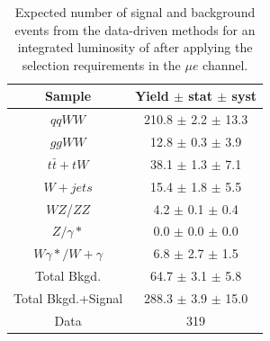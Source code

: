 \begin{table}[ht!]
  \begin{center}
  \begin{tabular} {|c|c|}
\hline
Sample                & Yield $\pm$ stat $\pm$ syst \\ \hline \hline
$qqWW$                & 210.8 $\pm$  2.2 $\pm$ 13.3  \\ \hline
$ggWW$                & 12.8 $\pm$  0.3 $\pm$  3.9  \\ \hline
$t\bar{t} + tW$      & 38.1 $\pm$  1.3 $\pm$  7.1  \\ \hline
$W+jets$              & 15.4 $\pm$  1.8 $\pm$  5.5  \\ \hline
$WZ$/$ZZ$             &  4.2 $\pm$  0.1 $\pm$  0.4  \\ \hline
$Z/\gamma*$          &  0.0 $\pm$  0.0 $\pm$  0.0  \\ \hline
$W\gamma*/W+\gamma$ &  6.8 $\pm$  2.7 $\pm$  1.5  \\ \hline \hline
Total Bkgd.           & 64.7 $\pm$  3.1 $\pm$  5.8  \\ \hline \hline
Total Bkgd.+Signal    & 288.3 $\pm$  3.9 $\pm$ 15.0  \\ \hline \hline
Data                  & 319 \\ \hline
\end{tabular}
  \caption{Expected number of signal and background events from the data-driven methods for
  an integrated luminosity of \intlumi after applying the selection requirements in the $\mu e$ channel.}
   \label{tab:data_yields_me}
  \end{center}
\end{table}

